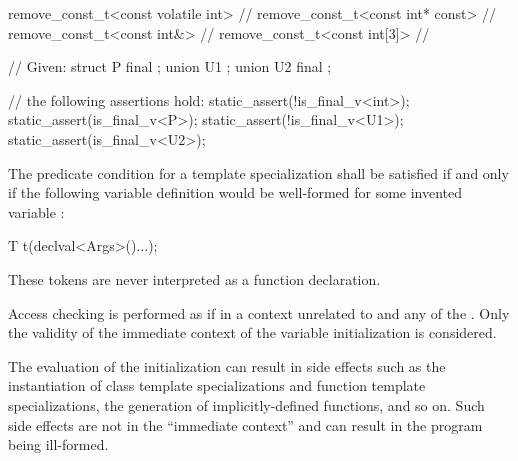 \pnum
\begin{example}
\begin{codeblock}
remove_const_t<const volatile int>  // 
remove_const_t<const int* const>    // 
remove_const_t<const int&>          // 
remove_const_t<const int[3]>        // 
\end{codeblock}
\end{example}

\pnum
\begin{example}
\begin{codeblock}
// Given:
struct P final { };
union U1 { };
union U2 final { };

// the following assertions hold:
static_assert(!is_final_v<int>);
static_assert(is_final_v<P>);
static_assert(!is_final_v<U1>);
static_assert(is_final_v<U2>);
\end{codeblock}
\end{example}

%
\pnum
The predicate condition for a template specialization
 shall be satisfied if and only if the
following variable definition would be well-formed for some invented variable :

\begin{codeblock}
T t(declval<Args>()...);
\end{codeblock}

\begin{note}
These tokens are never interpreted as a function declaration.
\end{note}
Access checking is performed as if in a context unrelated to 
and any of the . Only the validity of the immediate context of the
variable initialization is considered.
\begin{note}
The evaluation of the
initialization can result in side effects such as the instantiation of class
template specializations and function template specializations, the generation
of implicitly-defined functions, and so on. Such side effects are not in the
``immediate context'' and can result in the program being ill-formed.
\end{note}

